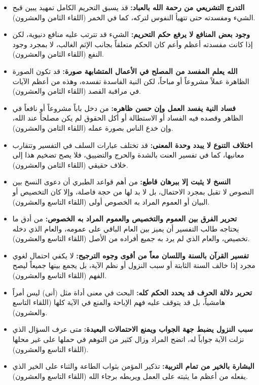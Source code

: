 \begin{itemize}
    \item \textbf{التدرج التشريعي من رحمة الله بالعباد:} قد يسبق التحريم الكامل تمهيد يبين قبح الشيء ومفسدته حتى تتهيأ النفوس لتركه، كما في الخمر (اللقاء الثامن والعشرون).
    \item \textbf{وجود بعض المنافع لا يرفع حكم التحريم:} الشيء قد تترتب عليه منافع دنيوية، لكن إذا كانت مفسدته أعظم وأعم كان الحكم متعلقاً بجانب الإثم الغالب، لا بمجرد وجود النفع (اللقاء الثامن والعشرون).
    \item \textbf{الله يعلم المفسد من المصلح في الأعمال المتشابهة صورة:} قد تكون الصورة الظاهرة عملاً مشروعاً أو مباحاً، لكن النية الفاسدة تفسده، وهذه من أعظم الآيات في مراقبة القصد (اللقاء الثامن والعشرون).
    \item \textbf{فساد النية يفسد العمل وإن حسن ظاهره:} من دخل باباً مشروعاً أو نافعاً في الظاهر وقصده فيه الفساد أو الاستطالة أو أكل الحقوق لم يكن مصلحاً عند الله، وإن خدع الناس بصورة عمله (اللقاء الثامن والعشرون).
    \item \textbf{اختلاف التنوع لا يبدد وحدة المعنى:} قد تختلف عبارات السلف في التفسير وتتقارب معانيها، كما في تفسير العنت بالشدة والحرج والتضييق، فلا يصح تضخيم هذا إلى خلاف حقيقي (اللقاء الثامن والعشرون).
    \item \textbf{النسخ لا يثبت إلا ببرهان قاطع:} من أهم قواعد الطبري أن دعوى النسخ بين النصوص لا تقبل بمجرد الاحتمال، بل لا بد لها من حجة فاصلة، وإلا كان التخصيص أو البيان أو العموم المراد به الخصوص أولى (اللقاء التاسع والعشرون).
    \item \textbf{تحرير الفرق بين العموم والتخصيص والعموم المراد به الخصوص:} من أدق ما يحتاجه طالب التفسير أن يميز بين العام الباقي على عمومه، والعام الذي دخله تخصيص، والعام الذي لم يرد به جميع أفراده من الأصل (اللقاء التاسع والعشرون).
    \item \textbf{تفسير القرآن بالسنة واللسان معاً من أقوى وجوه الترجيح:} لا يكفي احتمال لغوي مجرد إذا خالف السنة الثابتة أو سبب النزول أو نظم الآية، بل يجمع بينها جميعاً ليصح الفهم (اللقاء التاسع والعشرون).
    \item \textbf{تحرير دلالة الحرف قد يحدد الحكم كله:} البحث في معنى أداة مثل (أنى) ليس أمراً هامشياً، بل قد يتوقف عليه فهم الإباحة والمنع في الآية كلها (اللقاء التاسع والعشرون).
    \item \textbf{سبب النزول يضبط جهة الجواب ويمنع الاحتمالات البعيدة:} متى عرف السؤال الذي نزلت الآية جواباً له، اتضح المراد وزال كثير من التوهم في حملها على غير محلها (اللقاء التاسع والعشرون).
    \item \textbf{البشارة بالخير من تمام التربية:} تذكير المؤمن بثواب الطاعة والثناء على الخير الذي يفعله من أعظم ما يثبته على العمل ويربطه برجاء الله (اللقاء التاسع والعشرون).

\end{itemize}
